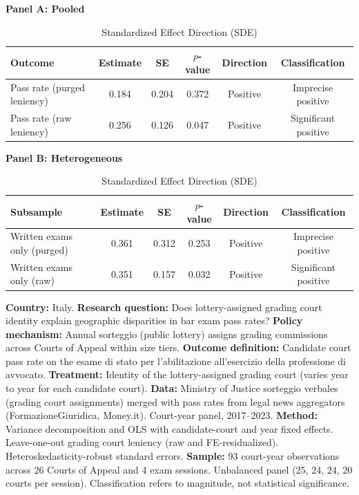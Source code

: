 \begin{table}[htbp]
\centering
\caption{Standardized Effect Direction (SDE)}
\label{tab:sde}

\textbf{Panel A: Pooled}

\begin{tabular}{lccccc}
\toprule
Outcome & Estimate & SE & $p$-value & Direction & Classification \\
\midrule
Pass rate (purged leniency) & 0.184 & 0.204 & 0.372 & Positive & Imprecise positive \\
Pass rate (raw leniency) & 0.256 & 0.126 & 0.047 & Positive & Significant positive \\
\bottomrule
\end{tabular}

\vspace{0.5cm}
\textbf{Panel B: Heterogeneous}

\begin{tabular}{lccccc}
\toprule
Subsample & Estimate & SE & $p$-value & Direction & Classification \\
\midrule
Written exams only (purged) & 0.361 & 0.312 & 0.253 & Positive & Imprecise positive \\
Written exams only (raw) & 0.351 & 0.157 & 0.032 & Positive & Significant positive \\
\bottomrule
\end{tabular}

\begin{minipage}{0.95\textwidth}
\footnotesize
\vspace{0.3cm}
\textbf{Country:} Italy.
\textbf{Research question:} Does lottery-assigned grading court identity explain geographic disparities in bar exam pass rates?
\textbf{Policy mechanism:} Annual sorteggio (public lottery) assigns grading commissions across Courts of Appeal within size tiers.
\textbf{Outcome definition:} Candidate court pass rate on the esame di stato per l'abilitazione all'esercizio della professione di avvocato.
\textbf{Treatment:} Identity of the lottery-assigned grading court (varies year to year for each candidate court).
\textbf{Data:} Ministry of Justice sorteggio verbales (grading court assignments) merged with pass rates from legal news aggregators (FormazioneGiuridica, Money.it). Court-year panel, 2017--2023.
\textbf{Method:} Variance decomposition and OLS with candidate-court and year fixed effects. Leave-one-out grading court leniency (raw and FE-residualized). Heteroskedasticity-robust standard errors.
\textbf{Sample:} 93 court-year observations across 26 Courts of Appeal and 4 exam sessions. Unbalanced panel (25, 24, 24, 20 courts per session).
Classification refers to magnitude, not statistical significance.
\end{minipage}
\end{table}

